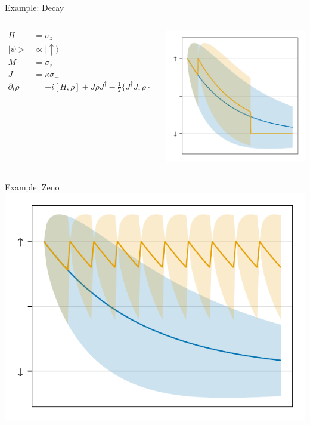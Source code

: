 \documentclass[
]{beamer}
\begin{document}
\begin{frame}{Example: Decay}
	\begin{columns}
		\begin{align*}
			H &= \sigma_z\\
			|\psi> &\propto |\uparrow\rangle\\
			M &= \sigma_z\\
			J &= \kappa\sigma_-\\
			\partial_t\rho &= -i [H, \rho] + J\rho J^\dagger - \frac{1}{2} \{J^\dagger J, \rho\} 
		\end{align*}
		
		\centering
		\vspace{-1cm}
		\includegraphics{figures/04 discreate.pdf}
	\end{columns}
\end{frame}

\begin{frame}{Example: Zeno}
	\centering
	\includegraphics{figures/04 discreate zeno.pdf}
\end{frame}
\end{document}
